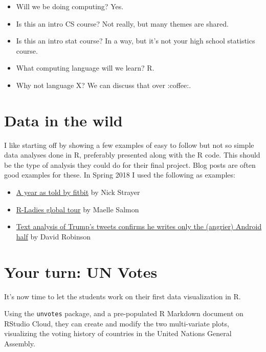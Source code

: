 \documentclass[]{book}
\providecommand{\tightlist}{%
  \setlength{\itemsep}{0pt}\setlength{\parskip}{0pt}}
\theoremstyle{definition}
\theoremstyle{definition}
\theoremstyle{definition}
\theoremstyle{remark}
\begin{document}
\begin{itemize}
\tightlist
\item
  Will we be doing computing? Yes.
\item
  Is this an intro CS course? Not really, but many themes are shared.
\item
  Is this an intro stat course? In a way, but it's not your high school
  statistics course.
\item
  What computing language will we learn? R.
\item
  Why not language X? We can discuss that over :coffee:.
\end{itemize}

\section{Data in the wild}\label{data-in-the-wild}

I like starting off by showing a few examples of easy to follow but not
so simple data analyses done in R, preferably presented along with the R
code. This should be the type of analysis they could do for their final
project. Blog posts are often good examples for these. In Spring 2018 I
used the following as examples:

\begin{itemize}
\tightlist
\item
  \href{http://livefreeordichotomize.com/2017/12/27/a-year-as-told-by-fitbit/}{A
  year as told by fitbit} by Nick Strayer
\item
  \href{http://www.masalmon.eu/2017/10/06/globalrladiestour/}{R-Ladies
  global tour} by Maelle Salmon
\item
  \href{http://varianceexplained.org/r/trump-tweets/}{Text analysis of
  Trump's tweets confirms he writes only the (angrier) Android half} by
  David Robinson
\end{itemize}

\section{Your turn: UN Votes}\label{your-turn-un-votes}

It's now time to let the students work on their first data visualization
in R.

Using the \texttt{unvotes} package, and a pre-populated R Markdown
document on RStudio Cloud, they can create and modify the two
multi-variate plots, visualizing the voting history of countries in the
United Nations General Assembly.
\end{document}
